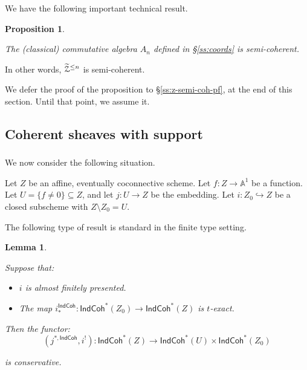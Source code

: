 \documentclass[reqno,11pt]{amsart}
\numberwithin{equation}{subsection}
\newtheorem{lem}[thm]{Lemma}
\newtheorem{prop}[thm]{Proposition}
\theoremstyle{remark}
\newcommand{\into}{\hookrightarrow}
\newcommand{\bA}{{\mathbb A}}
\newcommand{\sZ}{{\EuScript Z}}
\newcommand{\IndCoh}{\mathsf{IndCoh}}
\renewcommand{\subset}{\subseteq}
\begin{document}
\subsubsection{}

We have the following important technical result.

\begin{prop}\label{p:semi-coh}

The (classical) commutative algebra $A_n$ defined in \S \ref{ss:coords} is
semi-coherent.

\end{prop}

In other words, $\widetilde{\sZ}^{\leq n}$ is semi-coherent.

We defer the proof of the proposition to \S \ref{ss:z-semi-coh-pf}, 
at the end of this section. Until that point, we assume it.

\subsection{Coherent sheaves with support}

\subsubsection{}

We now consider the following situation. 

Let $Z$ be an affine, eventually coconnective scheme. 
Let $f:Z \to \bA^1$ be a function. Let $U = \{f \neq 0\} \subset Z$, 
and let $j:U \to Z$ be the embedding.
Let $i:Z_0 \into Z$ be a closed subscheme with 
$Z \setminus Z_0 = U$.

The following type of result is standard in the finite type setting.

\begin{lem}\label{l:coh-supp}

Suppose that:

\begin{itemize}

\item $i$ is almost finitely presented.

\item The map $i_*^{\IndCoh}:\IndCoh^*(Z_0) \to \IndCoh^*(Z)$ is $t$-exact.

\end{itemize}

\noindent Then the functor:
%
\[
(j^{*,\IndCoh},i^!):\IndCoh^*(Z) \to \IndCoh^*(U) \times \IndCoh^*(Z_0)
\]

\noindent is conservative. 

\end{lem}
\end{document}
